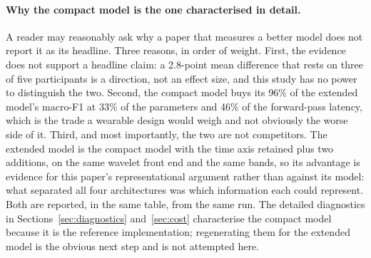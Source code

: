 \documentclass[pdflatex,sn-nature,iicol]{sn-jnl}
\begin{document}
\paragraph{Why the compact model is the one characterised in detail.} A reader may reasonably ask why a paper that measures a better model does not report it as its headline. Three reasons, in order of weight. First, the evidence does not support a headline claim: a 2.8-point mean difference that rests on three of five participants is a direction, not an effect size, and this study has no power to distinguish the two. Second, the compact model buys its 96\% of the extended model's macro-F1 at 33\% of the parameters and 46\% of the forward-pass latency, which is the trade a wearable design would weigh and not obviously the worse side of it. Third, and most importantly, the two are not competitors. The extended model is the compact model with the time axis retained plus two additions, on the same wavelet front end and the same bands, so its advantage is evidence for this paper's representational argument rather than against its model: what separated all four architectures was which information each could represent. Both are reported, in the same table, from the same run. The detailed diagnostics in Sections~\ref{sec:diagnostics} and~\ref{sec:cost} characterise the compact model because it is the reference implementation; regenerating them for the extended model is the obvious next step and is not attempted here.
\end{document}
